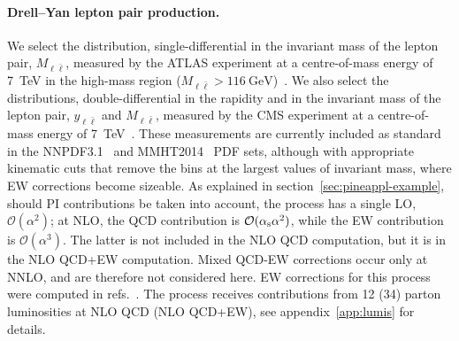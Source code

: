 \paragraph{Drell--Yan lepton pair production.}
We select the distribution, single-differential in the invariant mass of the
lepton pair, $M_{\ell \bar\ell}$, measured by the ATLAS experiment at a centre-of-mass
energy of \SI{7}{\tera\electronvolt} in the high-mass region
($M_{\ell\bar\ell}>\SI{116}{\giga\electronvolt}$)~\cite{Aad:2013iua}.
We also select the distributions, double-differential in the rapidity and in
the invariant mass of the lepton pair, $y_{\ell\bar\ell}$ and $M_{\ell\bar\ell}$,
measured by the CMS experiment at a centre-of-mass energy of
\SI{7}{\tera\electronvolt}~\cite{Chatrchyan:2013tia}.
These measurements are currently included as standard in the
NNPDF3.1~\cite{Ball:2017nwa} and MMHT2014~\cite{Harland-Lang:2014zoa} PDF sets,
although with appropriate kinematic cuts that remove the bins at the largest
values of invariant mass, where EW corrections become sizeable. As explained in
section~\ref{sec:pineappl-example}, should PI contributions be taken into account,
the process has a single LO, $\mathcal{O}(\alpha^2)$; at NLO, the
QCD contribution is $\mathcal{O}(\alpha_\mathrm{s}\alpha^2)$, while the EW contribution
is $\mathcal{O}(\alpha^3)$. The latter is not included in the NLO
QCD computation, but it is in the NLO QCD+EW computation. Mixed QCD-EW
corrections occur only at NNLO, and are therefore not considered here.
EW corrections for this process were computed in
refs.~\cite{Baur:2001ze,Dittmaier:2009cr}. The process receives contributions
from 12 (34) parton luminosities at NLO QCD (NLO QCD+EW),
see appendix~\ref{app:lumis} for details.


